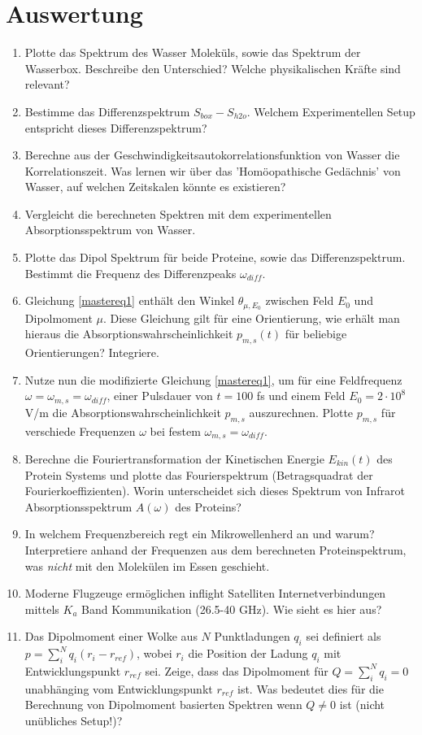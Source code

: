 \documentclass[a4paper,12pt]{article}
\begin{document}
\section*{Auswertung}
\begin{enumerate}
 \item Plotte das Spektrum des Wasser Moleküls, sowie das Spektrum der Wasserbox. Beschreibe den Unterschied? Welche physikalischen Kräfte sind relevant?
 \item Bestimme das Differenzspektrum $S_{box}-S_{h2o}$. Welchem Experimentellen Setup entspricht dieses Differenzspektrum?
 \item Berechne aus der Geschwindigkeitsautokorrelationsfunktion von Wasser die Korrelationszeit. Was lernen wir über das 'Homöopathische Gedächnis' von Wasser, auf welchen Zeitskalen könnte es existieren?
 \item Vergleicht die berechneten Spektren mit dem experimentellen Absorptionsspektrum von Wasser.

 \item Plotte das Dipol Spektrum für beide Proteine, sowie das Differenzspektrum. Bestimmt die Frequenz des Differenzpeaks $\omega_{diff}$.
 \item Gleichung \ref{mastereq1} enthält den Winkel $\theta_{\mu,E_0}$ zwischen Feld $E_0$ und Dipolmoment $\mu$. Diese Gleichung gilt für eine Orientierung, wie erhält man hieraus die Absorptionswahrscheinlichkeit
 $p_{m,s}(t)$ für beliebige Orientierungen? Integriere.
 \item Nutze nun die modifizierte Gleichung \ref{mastereq1}, um für eine Feldfrequenz $\omega=\omega_{m,s}=\omega_{diff}$, einer Pulsdauer von $t=100$ fs und einem Feld $E_0=2\cdot10^8$ V/m
 die Absorptionswahrscheinlichkeit $p_{m,s}$ auszurechnen. Plotte $p_{m,s}$ für verschiede Frequenzen $\omega$ bei festem $\omega_{m,s}=\omega_{diff}$.
 \item Berechne die Fouriertransformation der Kinetischen Energie $E_{kin}(t)$ des Protein Systems und plotte das Fourierspektrum (Betragsquadrat der Fourierkoeffizienten). Worin unterscheidet sich dieses
 Spektrum von Infrarot Absorptionsspektrum $A(\omega)$ des Proteins?
 
 \item In welchem Frequenzbereich regt ein Mikrowellenherd an und warum? Interpretiere anhand der Frequenzen aus dem berechneten Proteinspektrum, was \emph{nicht} mit den Molekülen im Essen geschieht. 
 \item Moderne Flugzeuge ermöglichen inflight Satelliten Internetverbindungen mittels $K_a$ Band Kommunikation (26.5-40 GHz). Wie sieht es hier aus?
 \item Das Dipolmoment einer Wolke aus $N$ Punktladungen $q_i$ sei definiert als $p=\sum_i^N q_i (r_i-r_{ref})$, wobei $r_i$ die Position der Ladung $q_i$
 mit Entwicklungspunkt $r_{ref}$ sei. Zeige, dass das Dipolmoment für $Q=\sum_i^N q_i=0$ unabhänging vom Entwicklungspunkt $r_{ref}$ ist. Was bedeutet dies für
 die Berechnung von Dipolmoment basierten Spektren wenn $Q\neq0$ ist (nicht unübliches Setup!)?
\end{enumerate}
\end{document}
